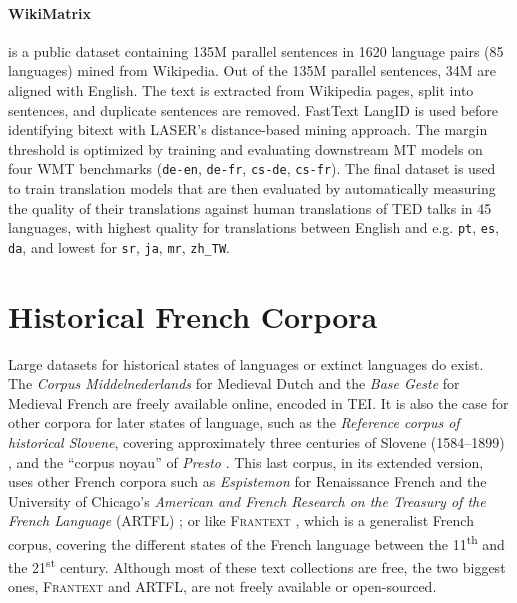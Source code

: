 \paragraph{WikiMatrix~\citep{schwenk-etal-2021-wikimatrix}} is a public dataset containing 135M parallel sentences in 1620 language pairs (85 languages) mined from Wikipedia. Out of the 135M parallel sentences, 34M are aligned with English. The text is extracted from Wikipedia pages, split into sentences, and duplicate sentences are removed. FastText LangID is used before identifying bitext with LASER's distance-based mining approach. The margin threshold is optimized by training and evaluating downstream MT models on four WMT benchmarks (\texttt{de-en}, \texttt{de-fr}, \texttt{cs-de}, \texttt{cs-fr}). The final dataset is used to train translation models that are then evaluated by automatically measuring the quality of their translations against human translations of TED talks in 45 languages, with highest quality for translations between English and e.g. \texttt{pt}, \texttt{es}, \texttt{da}, and lowest for \texttt{sr}, \texttt{ja}, \texttt{mr}, \texttt{zh\_TW}.


\section{Historical French Corpora}

Large datasets for historical states of languages or extinct languages do exist. The \emph{Corpus Middelnederlands} for Medieval Dutch \citep{reenen-etal-1998-corpus} and the \emph{Base Geste} for Medieval French \citep{camps-etal-2019-geste} are freely available online, encoded in TEI. It is also the case for other corpora for later states of language, such as the \emph{Reference corpus of historical Slovene}, covering approximately three centuries of Slovene (1584--1899)  \citep{erjavec-2015-reference}, and the ``corpus noyau'' of \emph{Presto} \citep{blumenthal-2018-presto}. This last corpus, in its extended version, uses other French corpora such as \emph{Espistemon} for Renaissance French \citep{demonet-1998-epistemon} and the University of Chicago's \emph{American and French Research on the Treasury of the French Language} (ARTFL) \citep{morrissey-olsen-1991-american}; or like \textsc{Frantext} \citep{atilf-1998-frantext}, which is a generalist French corpus, covering the different states of the French language between the 11\textsuperscript{th} and the 21\textsuperscript{st} century. Although most of these text collections are free, the two biggest ones, \textsc{Frantext} and ARTFL, are not freely available or open-sourced.

